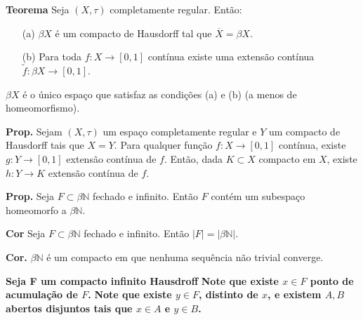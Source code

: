 \documentclass{article}
\begin{document}
\begin{landscape}
\begin{multicols}{3}
\medskip

\textbf{Teorema} Seja \((X,\tau)\) completamente regular. Então:
\begin{itemize}
  \item[(a)] \(\beta X\) é um compacto de Hausdorff tal que \(\overline{X}=\beta X\).
  \item[(b)] Para toda \(f\colon X\to[0,1]\) contínua existe uma extensão contínua \(\widetilde f\colon\beta X\to[0,1]\).
\end{itemize}
 \color{blue!70}\(\beta X\) é o único espaço que satisfaz as condições (a) e (b) (a menos de homeomorfismo).\color{Black}

\medskip

\textbf{Prop.} Sejam \((X,\tau)\) um espaço completamente regular e \(Y\) um compacto de Hausdorff tais que \(X=Y\). Para qualquer função \(f\colon X\to[0,1]\) contínua, existe \(g\colon Y\to[0,1]\) extensão contínua de \(f\). Então, dada \(K\subset X\) compacto em \(X\), existe \(h\colon Y\to K\) extensão contínua de \(f\).

\medskip

\textbf{Prop.} Seja \(F\subset\beta\mathbb{N}\) fechado e infinito. Então \(F\) contém um subespaço homeomorfo a \(\beta\mathbb{N}\).

\medskip

\textbf{Cor} Seja \(F\subset\beta\mathbb{N}\) fechado e infinito. Então \(\lvert F\rvert = \lvert \beta\mathbb{N}\rvert\).

\medskip

\textbf{Cor.} \(\beta\mathbb{N}\) é um compacto em que nenhuma sequência não trivial converge.

\medskip
\color{blue!70}
\textbf{Seja F um compacto infinito Hausdroff}
 \textbf{ Note que existe \(x \in F\) ponto de acumulação de \(F\).}
  \textbf{ Note que existe \(y \in F\), distinto de \(x\), e existem \(A,B\) abertos disjuntos tais que \(x\in A\) e \(y\in B\).}

\end{multicols}
\end{landscape}
\end{document}
